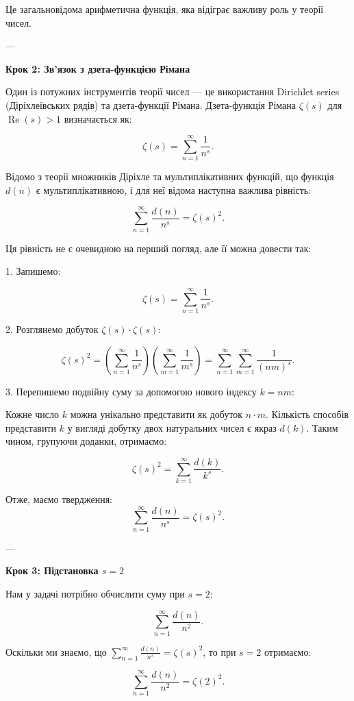 \documentclass{article}
\begin{document}
Це загальновідома арифметична функція, яка відіграє важливу роль у теорії чисел.

---

\textbf{Крок 2: Зв’язок з дзета-функцією Рімана}

Один із потужних інструментів теорії чисел — це використання Dirichlet series (Діріхлеївських рядів) та дзета-функції Рімана. Дзета-функція Рімана \(\zeta(s)\) для \(\operatorname{Re}(s) > 1\) визначається як:

\[
\zeta(s) = \sum_{n=1}^{\infty} \frac{1}{n^s}.
\]

Відомо з теорії множників Діріхле та мультиплікативних функцій, що функція \( d(n) \) є мультиплікативною, і для неї відома наступна важлива рівність:

\[
\sum_{n=1}^{\infty} \frac{d(n)}{n^s} = \zeta(s)^2.
\]

Ця рівність не є очевидною на перший погляд, але її можна довести так:

1. Запишемо:

   \[
   \zeta(s) = \sum_{n=1}^{\infty} \frac{1}{n^s}.
   \]

2. Розглянемо добуток \(\zeta(s) \cdot \zeta(s)\):

   \[
   \zeta(s)^2 = \left(\sum_{n=1}^{\infty} \frac{1}{n^s}\right)\left(\sum_{m=1}^{\infty} \frac{1}{m^s}\right) = \sum_{n=1}^{\infty}\sum_{m=1}^{\infty} \frac{1}{(nm)^s}.
   \]

3. Перепишемо подвійну суму за допомогою нового індексу \( k = nm \):

   Кожне число \( k \) можна унікально представити як добуток \( n \cdot m \). Кількість способів представити \( k \) у вигляді добутку двох натуральних чисел є якраз \( d(k) \). Таким чином, групуючи доданки, отримаємо:

   \[
   \zeta(s)^2 = \sum_{k=1}^{\infty} \frac{d(k)}{k^s}.
   \]

Отже, маємо твердження:
\[
\sum_{n=1}^{\infty} \frac{d(n)}{n^s} = \zeta(s)^2.
\]

---

\textbf{Крок 3: Підстановка \( s = 2 \)}

Нам у задачі потрібно обчислити суму при \( s=2 \):

\[
\sum_{n=1}^{\infty} \frac{d(n)}{n^2}.
\]

Оскільки ми знаємо, що \(\sum_{n=1}^{\infty} \frac{d(n)}{n^s} = \zeta(s)^2\), то при \( s=2 \) отримаємо:

\[
\sum_{n=1}^{\infty} \frac{d(n)}{n^2} = \zeta(2)^2.
\]
\end{document}
